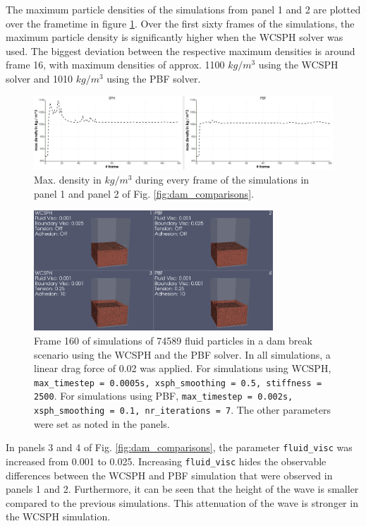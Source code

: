 \documentclass[11pt, letterpaper, twocolumn]{article}
\begin{document}
The maximum particle densities of the simulations from panel 1 and 2 are plotted over the frametime in figure \ref{fig:max_densities}.
Over the first sixty frames of the simulations, the maximum particle density is significantly higher when the WCSPH solver was used. The biggest deviation between the respective maximum densities is around frame 16, with maximum densities of approx. 1100 $kg / m^3$ using the WCSPH solver and 1010 $kg / m^3$ using the PBF solver. 

\begin{figure}[t]
  \centering
  \includegraphics[width=\textwidth]{images/density_graphs.PNG}
  \caption{Max. density in $kg / m^3$ during every frame of the simulations in panel 1 and panel 2 of Fig. \ref{fig:dam_comparisons}.}
  \label{fig:max_densities}
\end{figure}

\begin{figure}[!b]
  \centering
  \includegraphics[width=0.8\textwidth]{images/smallDam_XI_XII_tilted.0160.png}
  \caption{Frame 160 of simulations of 74589 fluid particles in a dam break scenario using the WCSPH and the PBF solver. In all simulations, a linear drag force of 0.02 was applied. For simulations using WCSPH, \texttt{max\_timestep = 0.0005s,
  xsph\_smoothing = 0.5, stiffness = 2500}. For simulations using PBF, \texttt{max\_timestep = 0.002s, xsph\_smoothing = 0.1, nr\_iterations = 7}. The other parameters were set as noted in the panels.}
  \label{fig:dam_comparisons_boundary_visc_adhesion}
\end{figure}


In panels 3 and 4 of Fig. \ref{fig:dam_comparisons}, the parameter \texttt{fluid\_visc} was increased from 0.001 to 0.025. Increasing \texttt{fluid\_visc} hides the observable differences between the WCSPH and PBF simulation that were observed in panels 1 and 2.
Furthermore, it can be seen that the height of the wave is smaller compared to the previous simulations. This attenuation of the wave is stronger in the WCSPH simulation.
\end{document}
